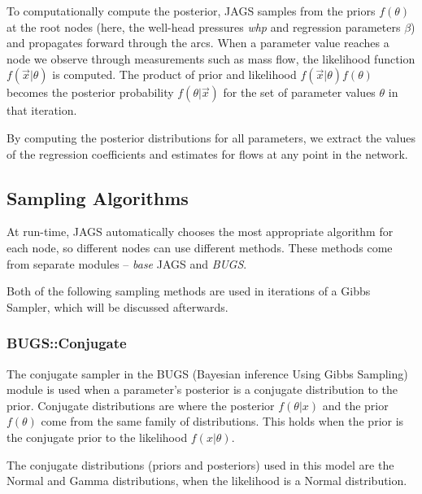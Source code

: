 \documentclass[a4paper, 12pt]{article}
\begin{document}
To computationally compute the posterior, JAGS samples from the priors $f(\theta)$ at the root nodes (here, the well-head pressures \emph{whp} and regression parameters $\beta$) and propagates forward through the arcs. When a parameter value reaches a node we observe through measurements such as mass flow, the likelihood function $f(\vec{x}|\theta)$ is computed. The product of prior and likelihood $f(\vec{x}|\theta)f(\theta)$ becomes the posterior probability $f(\theta|\vec{x})$ for the set of parameter values $\theta$ in that iteration.

By computing the posterior distributions for all parameters, we extract the values of the regression coefficients and estimates for flows at any point in the network.

\subsection{Sampling Algorithms}
At run-time, JAGS automatically chooses the most appropriate algorithm for each node, so different nodes can use different methods. These methods come from separate modules -- \emph{base} JAGS and \emph{BUGS}.

Both of the following sampling methods are used in iterations of a Gibbs Sampler, which will be discussed afterwards.

\subsubsection{BUGS::Conjugate}
The conjugate sampler in the BUGS (Bayesian inference Using Gibbs Sampling) module is used when a parameter's posterior is a conjugate distribution to the prior. Conjugate distributions are where the posterior $f(\theta|x)$ and the prior $f(\theta)$ come from the same family of distributions. This holds when the prior is the conjugate prior to the likelihood $f(x|\theta)$.

The conjugate distributions (priors and posteriors) used in this model are the Normal and Gamma distributions, when the likelihood is a Normal distribution.
\end{document}
